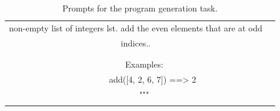 \begin{table}[t!]
\begin{tabular}{cl}
non-empty list of integers lst. add the even elements that are at odd\\indices..\\\\\\\ \ \ \ Examples:\\\ \ \ \ \ \ \ \ add([4, 2, 6, 7]) ==> 2 \\\ \ \ \ """\\}} \\
        \bottomrule
    \end{tabular}
    \caption{\label{tab:prompts-programming-gen}
    Prompts for the program generation task.
    }
\end{table}
